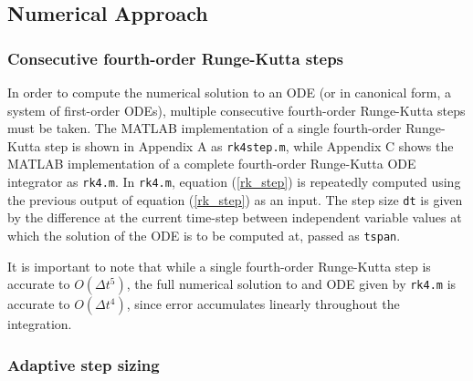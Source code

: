\documentclass[10pt]{article}
\def\code#1{\texttt{#1}} %
\begin{document}
\subsection*{Numerical Approach}

\subsubsection*{Consecutive fourth-order Runge-Kutta steps}

In order to compute the numerical solution to an ODE (or in canonical form, a system of first-order 
ODEs), multiple consecutive fourth-order Runge-Kutta steps must be taken. The MATLAB implementation of 
a single fourth-order Runge-Kutta step is shown in Appendix A as \code{rk4step.m}, while Appendix C 
shows the MATLAB implementation of a complete fourth-order Runge-Kutta ODE integrator as \code{rk4.m}. 
In \code{rk4.m}, equation (\ref{rk_step}) is repeatedly computed using the previous output of equation 
(\ref{rk_step}) as an input. The step size \code{dt} is given by the difference at the current time-step 
between independent variable values at which the solution of the ODE is to be computed at, passed as 
\code{tspan}.

It is important to note that while a single fourth-order Runge-Kutta step is accurate to $O(\Delta t^5)$,
the full numerical solution to and ODE given by \code{rk4.m} is accurate to $O(\Delta t^4)$, since
error accumulates linearly throughout the integration. 

\subsubsection*{Adaptive step sizing}
\end{document}
